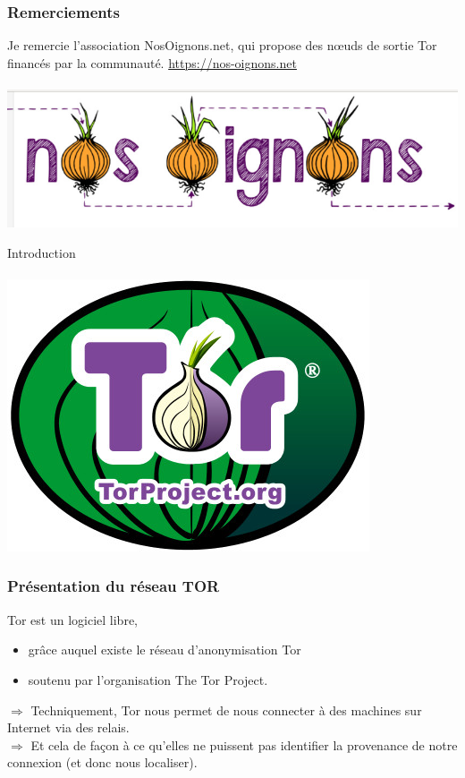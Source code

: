 \documentclass{beamer}
\begin{document}
\begin{frame}
\frametitle{Remerciements}
Je remercie l'association NosOignons.net, qui propose des nœuds de sortie Tor financés par la communauté.
\url{https://nos-oignons.net}
\\~\\
\includegraphics[scale=0.4]{./images/NosOignons.jpg}
\end{frame}
\begin{frame}
\begin{center}
\Huge{Introduction}
\\~\\ \includegraphics[scale=0.4]{./images/logo_tor.jpg}
\end{center}
\end{frame}
\begin{frame}
\frametitle{Présentation du réseau TOR}
Tor est un logiciel libre,
\begin{itemize}
\item grâce auquel existe le réseau d'anonymisation Tor
\item  soutenu par l'organisation The Tor Project.
\end{itemize}
$\Rightarrow$ Techniquement, Tor nous permet de nous connecter à des machines sur Internet via des relais. 
\\$\Rightarrow$ Et cela de façon à ce qu'elles ne puissent pas identifier la provenance de notre connexion (et donc nous localiser).
\end{frame}
\end{document}
